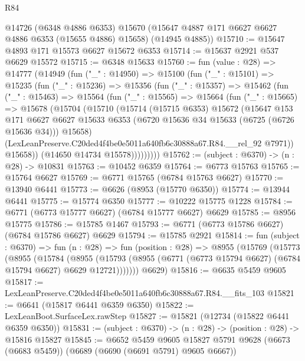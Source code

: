 \begin{lexlean}{R84}
\begin{coremodule}
      @14726
      (@6348 @4886 @6353)
      @15670
      (@15647 @4887 @171 @6627 @6627 @4886 @6353 (@15655 @4886) @15658)
      (@14945 @4885))
@15710 := @15647 @4893 @171 @15573 @6627 @15672 @6353
@15714 := @15637 @2921 @537 @6629 @15572
@15715 := @6348 @15633
@15760 := fun (value : @28) =>
  @14777
    (@14949
      (fun ("_" : @14950) =>
      @15100
        (fun ("_" : @15101) =>
        @15235
          (fun ("_" : @15236) =>
          @15356
            (fun ("_" : @15357) =>
            @15462
              (fun ("_" : @15463) =>
              @15564
                (fun ("_" : @15565) =>
                @15664
                  (fun ("_" : @15665) =>
                  @15678
                    (@15704
                      (@15710
                        (@15714
                          (@15715 @6353)
                          @15672
                          (@15647
                            @153
                            @171
                            @6627
                            @6627
                            @15633
                            @6353
                            (@6720 @15636 @34 @15633 (@6725 (@6726 @15636 @34)))
                            @15658)
                          (LexLeanPreserve.C20ded4f4be0e5011a640fb6c30888a67.R84.__rel_92 @7971))
                        @15658))
                    (@14650 @14734 @15578)))))))))
@15762 := (subject : @6370) -> (n : @28) -> @10831
@15763 := @10452 @6359
@15764 := @6773 @15763
@15765 := @15764 @6627
@15769 := @6771 @15765 (@6784 @15763 @6627)
@15770 := @13940 @6441
@15773 := @6626 (@8953 (@15770 @6350))
@15774 := @13944 @6441
@15775 := @15774 @6350
@15777 := @10222 @15775 @1228
@15784 := @6771 (@6773 @15777 @6627) (@6784 @15777 @6627) @6629
@15785 := @8956 @15775
@15786 := @15785 @1467
@15793 := @6771 (@6773 @15786 @6627) (@6784 @15786 @6627) @6629
@15794 := @15785 @2921
@15814 := fun (subject : @6370) =>
  fun (n : @28) =>
  fun (position : @28) =>
  @8955
    (@15769
      (@15773
        (@8955
          (@15784
            (@8955
              (@15793 (@8955 (@6771 (@6773 @15794 @6627) (@6784 @15794 @6627) @6629 @12721)))))))
      @6629)
@15816 := @6635 @5459 @9605
@15817 := LexLeanPreserve.C20ded4f4be0e5011a640fb6c30888a67.R84.__fits_103
@15821 := @6641 (@15817 @6441 @6359 @6350)
@15822 := LexLeanBoot.SurfaceLex.rawStep
@15827 := @15821 (@12734 (@15822 @6441 @6359 @6350))
@15831 := (subject : @6370) -> (n : @28) -> (position : @28) -> @15816 @15827
@15845 := @6652
    @5459
    @9605
    @15827
    @5791
    @9628
    (@6673 (@6683 @5459))
    (@6689 (@6690 (@6691 @5791) @9605 @6667))

\end{coremodule}
\end{lexlean}
